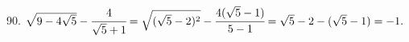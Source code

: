 90. $\sqrt{9-4\sqrt{5}}-\cfrac{4}{\sqrt{5}+1}=\sqrt{(\sqrt{5}-2)^2}-\cfrac{4(\sqrt{5}-1)}{5-1}=
\sqrt{5}-2-(\sqrt{5}-1)=-1.$\\
